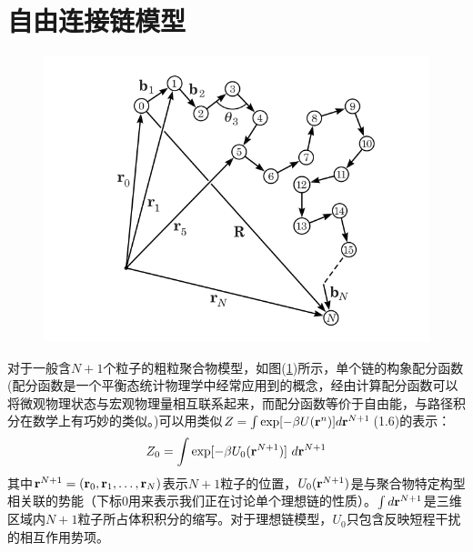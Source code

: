 \section{自由连接链模型}

\begin{figure}[H]
	\centering   
	\includegraphics[width=12cm]{Contents/chapter2/figures/2-1.png}
	\caption{ }
    \label{fig:2.1}
\end{figure}

对于一般含$N+1$个粒子的粗粒聚合物模型，如图(\ref{fig:2.1})所示，单个链的构象配分函数(配分函数是一个平衡态统计物理学中经常应用到的概念，经由计算配分函数可以将微观物理状态与宏观物理量相互联系起来，而配分函数等价于自由能，与路径积分在数学上有巧妙的类似。)可以用类似$Z=\int \exp[-\beta U(\mathbf{r}^{n})] d \mathbf{r}^{N+1}$(1.6)的表示：\\
\begin{equation}
Z_0 = \int \exp[-\beta U_{0}({\mathbf{r}}^{N+1})] ~d \mathbf{r}^{N+1}
\label{2.3}
\end{equation}
其中$\mathbf{r}^{N+1}=(\mathbf{r}_0,\mathbf{r}_1,\ldots,\mathbf{r}_{N})$表示$N+1$粒子的位置，$U_0(\mathbf{r}^{N+1})$是与聚合物特定构型相关联的势能（下标$0$用来表示我们正在讨论单个理想链的性质）。$\int d\mathbf{r}^{N+1}$是三维区域内$N+1$粒子所占体积积分的缩写。对于理想链模型，$U_0$只包含反映短程干扰的相互作用势项。\\

